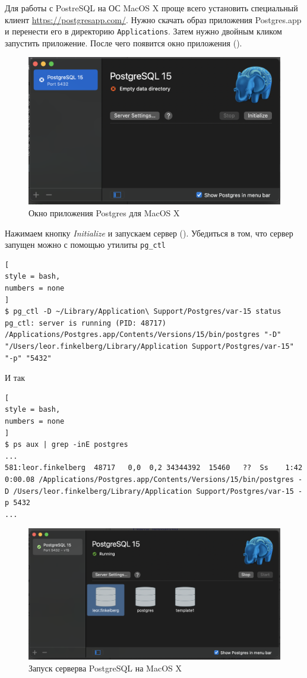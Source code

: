\documentclass[%
	11pt,
	a4paper,
	utf8,
		]{article}
\begin{document}
Для работы с PostreSQL на ОС MacOS X проще всего установить специальный клиент \url{https://postgresapp.com/}. Нужно скачать образ приложения Postgres.app и перенести его в директорию \verb|Applications|. Затем нужно двойным кликом запустить приложение. После чего появится окно приложения ().
\begin{figure}[h]
	\centering
	\includegraphics[scale=0.5]{figures/postgresapp.png}
	\caption{Окно приложения Postgres для MacOS X}\label{fig:postgresapp}
\end{figure}

Нажимаем кнопку \emph{Initialize} и запускаем сервер (). Убедиться в том, что сервер запущен можно с помощью утилиты \verb|pg_ctl|
\begin{lstlisting}[
style = bash,
numbers = none
]
$ pg_ctl -D ~/Library/Application\ Support/Postgres/var-15 status
pg_ctl: server is running (PID: 48717)
/Applications/Postgres.app/Contents/Versions/15/bin/postgres "-D" "/Users/leor.finkelberg/Library/Application Support/Postgres/var-15" "-p" "5432" 
\end{lstlisting}

И так
\begin{lstlisting}[
style = bash,
numbers = none
]
$ ps aux | grep -inE postgres
...
581:leor.finkelberg  48717   0,0  0,2 34344392  15460   ??  Ss    1:42     0:00.08 /Applications/Postgres.app/Contents/Versions/15/bin/postgres -D /Users/leor.finkelberg/Library/Application Support/Postgres/var-15 -p 5432
...
\end{lstlisting}

\begin{figure}[h]
	\centering
	\includegraphics[scale=0.5]{figures/postgresapp_run_server.png}
	\caption{Запуск серверва PostgreSQL на MacOS X}\label{fig:postgresapp_run_server}
\end{figure}
\end{document}
